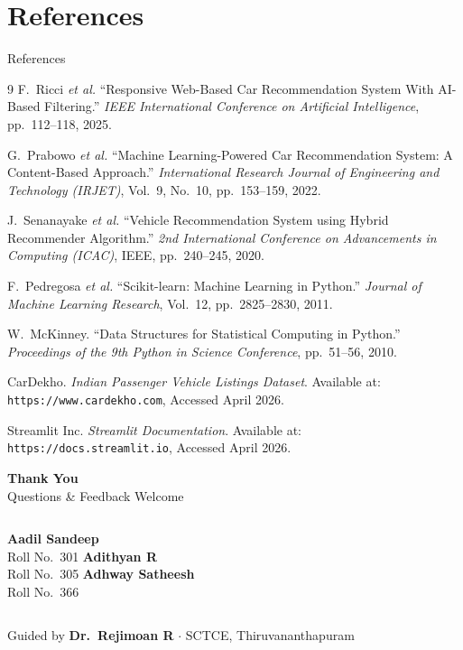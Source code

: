 \documentclass[aspectratio=169]{beamer}
\begin{document}
\section{References}
\begin{frame}{References}
  \footnotesize
  \begin{thebibliography}{9}
      F.\ Ricci \textit{et al.}
      ``Responsive Web-Based Car Recommendation System With AI-Based Filtering.''
      \textit{IEEE International Conference on Artificial Intelligence},
      pp.\ 112--118, 2025.

      G.\ Prabowo \textit{et al.}
      ``Machine Learning-Powered Car Recommendation System: A Content-Based Approach.''
      \textit{International Research Journal of Engineering and Technology (IRJET)},
      Vol.\ 9, No.\ 10, pp.\ 153--159, 2022.

      J.\ Senanayake \textit{et al.}
      ``Vehicle Recommendation System using Hybrid Recommender Algorithm.''
      \textit{2nd International Conference on Advancements in Computing (ICAC)},
      IEEE, pp.\ 240--245, 2020.

      F.\ Pedregosa \textit{et al.}
      ``Scikit-learn: Machine Learning in Python.''
      \textit{Journal of Machine Learning Research},
      Vol.\ 12, pp.\ 2825--2830, 2011.

      W.\ McKinney.
      ``Data Structures for Statistical Computing in Python.''
      \textit{Proceedings of the 9th Python in Science Conference},
      pp.\ 51--56, 2010.

      CarDekho.
      \textit{Indian Passenger Vehicle Listings Dataset}.
      Available at: \texttt{https://www.cardekho.com}, Accessed April 2026.

      Streamlit Inc.
      \textit{Streamlit Documentation}.
      Available at: \texttt{https://docs.streamlit.io}, Accessed April 2026.
  \end{thebibliography}
\end{frame}

\begin{frame}
  \centering
  \vspace{2em}
  {\Huge\color{sctceblue}\textbf{Thank You}}\\[1em]
  {\large Questions \& Feedback Welcome}\\[2em]
  \begin{columns}[c]
    \centering \textbf{Aadil Sandeep}\\\small Roll No.\ 301
    \centering \textbf{Adithyan R}\\\small Roll No.\ 305
    \centering \textbf{Adhway Satheesh}\\\small Roll No.\ 366
  \end{columns}
  \vspace{1em}
  \small Guided by \textbf{Dr.\ Rejimoan R} $\cdot$ SCTCE, Thiruvananthapuram
\end{frame}
\end{document}
